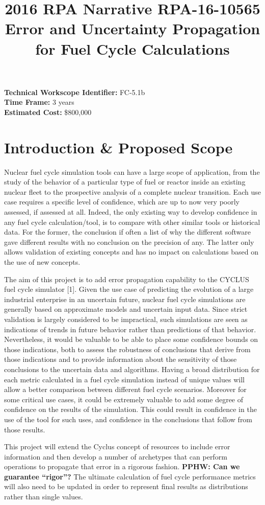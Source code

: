 \documentclass[dvips,12pt]{article}
\title{2016 RPA Narrative RPA-16-10565\\
Error and Uncertainty Propagation for Fuel Cycle Calculations}
\newcommand{\comment}[1]
{{\bfseries \color{red} #1}}
\begin{document}
\noindent\textbf{Technical Workscope Identifier:} FC-5.1b\\
\textbf{Time Frame:} 3 years\\
\textbf{Estimated Cost:} \$800,000


\section{Introduction \& Proposed Scope}
Nuclear fuel cycle simulation tools can have a large
scope of application, from the study of the
behavior of a particular type of fuel or reactor inside an
existing nuclear fleet to the prospective analysis
of a complete nuclear transition. 
Each use case
requires a specific level
of confidence, which are up to now very
poorly assessed, if assessed at all.
Indeed, the only existing way to develop confidence in
any fuel cycle calculation/tool, is to compare
with other similar tools or historical
data.  For the former, the conclusion if often 
a list of why the different software gave
different results with no conclusion on the
precision of any.  The latter only allows
validation of existing concepts and has no impact
on calculations based on the use of new
concepts.

The aim of this project is to add error
propagation capability to the CYCLUS fuel cycle
simulator [1]. Given the use case of predicting the
evolution of a large industrial enterprise in an
uncertain future, nuclear fuel cycle simulations
are generally based on approximate models and
uncertain input data.  Since strict validation is largely
considered to be impractical, such simulations are
seen as indications of trends in future behavior rather than
predictions of that behavior. Nevertheless, it
would be valuable to be able to place some
confidence bounds on those indications, both to
assess the robustness of conclusions that derive
from those indications and to provide information
about the sensitivity of those conclusions to the
uncertain data and algorithms.  Having a broad
distribution for each metric calculated in a fuel
cycle simulation instead of unique values will
allow a better comparison between different fuel
cycle scenarios.  Moreover for some critical
use cases, it could be extremely valuable to add
some degree of confidence on the results of the simulation.
This could result in confidence in the use of the tool for
such uses, and confidence in the conclusions that follow
from those results.

This project
will extend the Cyclus concept of resources to
include error information and then develop a
number of archetypes that can perform operations
to propagate that error in a rigorous fashion.
\comment{PPHW: Can we guarantee ``rigor''?}
The ultimate calculation of fuel cycle performance
metrics will also need to be updated in order to
represent final results as distributions rather
than single values.
\end{document}
